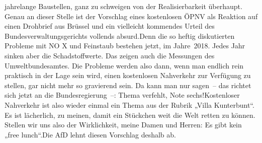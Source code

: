 \documentclass{article}
\begin{document}
jahrelange Baustellen, ganz zu schweigen von der Realisierbarkeit überhaupt. Genau an dieser Stelle ist der Vorschlag eines kostenlosen ÖPNV als Reaktion auf einen Drohbrief aus Brüssel und ein vielleicht kommendes Urteil des Bundesverwaltungsgerichts vollends absurd.Denn die so heftig diskutierten Probleme mit NO X und Feinstaub bestehen jetzt, im Jahre 2018. Jedes Jahr sinken aber die Schadstoffwerte. Das zeigen auch die Messungen des Umweltbundesamtes. Die Probleme werden also dann, wenn man endlich rein praktisch in der Lage sein wird, einen kostenlosen Nahverkehr zur Verfügung zu stellen, gar nicht mehr so gravierend sein. Da kann man nur sagen – das richtet sich jetzt an die Bundesregierung –: Thema verfehlt, Note sechs!Kostenloser Nahverkehr ist also wieder einmal ein Thema aus der Rubrik „Villa Kunterbunt“. Es ist lächerlich, zu meinen, damit ein Stückchen weit die Welt retten zu können. Stellen wir uns also der Wirklichkeit, meine Damen und Herren: Es gibt kein „free lunch“.Die AfD lehnt diesen Vorschlag deshalb ab.
\end{document}
